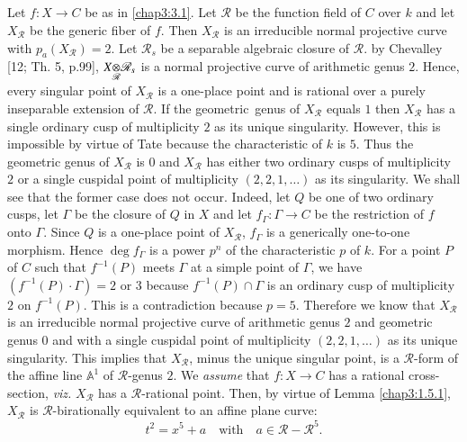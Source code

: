 \subsection{}\label{chap3:3.2}
Let $f:X\to C$ be as in \ref{chap3:3.1}. Let $\mathscr{R}$ be the function
field of $C$ over $k$ and let $X_{\mathscr{R}}$ be the generic fiber
of $f$. Then $X_{\mathscr{R}}$ is an irreducible normal projective
curve with $p_{a}(X_{\mathscr{R}})=2$. Let $\mathscr{R}_{s}$ be a
separable algebraic closure of $\mathscr{R}$. by Chevalley [12; Th.\@
  5, p.99], $\foprod{X}{\mathscr{R}_{s}}{\mathscr{R}}$ is a normal
projective curve of arithmetic genus $2$. Hence, every singular point
of $X_{\mathscr{R}}$ is a one-place point and is rational over a
purely inseparable extension of $\mathscr{R}$. If the
geometric\pageoriginale\ genus of $X_{\mathscr{R}}$ equals $1$ then
$X_{\mathscr{R}}$ has a single ordinary cusp of multiplicity $2$ as
its unique singularity. However, this is impossible by virtue of Tate
\cite{55} because the characteristic of $k$ is $5$. Thus the geometric
genus of $X_{\mathscr{R}}$ is $0$ and $X_{\mathscr{R}}$ has either two
ordinary cusps of multiplicity $2$ or a single cuspidal point of
multiplicity $(2,2,1,\ldots)$ as its singularity. We shall see that
the former case does not occur. Indeed, let $Q$ be one of two ordinary
cusps, let $\Gamma$ be the closure of $Q$ in $X$ and let
$f_{\Gamma}:\Gamma\to C$ be the restriction of $f$ onto
$\Gamma$. Since $Q$ is a one-place point of $X_{\mathscr{R}}$,
$f_{\Gamma}$ is a generically one-to-one morphism. Hence $\deg
f_{\Gamma}$ is a power $p^{n}$ of the characteristic $p$ of $k$. For a
point $P$ of $C$ such that $f^{-1}(P)$ meets $\Gamma$ at a simple
point of $\Gamma$, we have $(f^{-1}(P)\cdot \Gamma)=2$ or $3$ because
$f^{-1}(P)\cap \Gamma$ is an ordinary cusp of multiplicity $2$ on
$f^{-1}(P)$. This is a contradiction because $p=5$. Therefore we know
that $X_{\mathscr{R}}$ is an irreducible normal projective curve of
arithmetic genus $2$ and geometric genus $0$ and with a single
cuspidal point of multiplicity $(2,2,1,\ldots)$ as its unique
singularity. This implies that $X_{\mathscr{R}}$, minus the unique
singular point, is a $\mathscr{R}$-form of the affine line
$\mathbb{A}^{1}$ of $\mathscr{R}$-genus $2$. We {\em assume} that
$f:X\to C$ has a rational cross-section, {\em viz.\@}
$X_{\mathscr{R}}$ has a $\mathscr{R}$-rational point. Then, by virtue
of Lemma \ref{chap3:1.5.1}, $X_{\mathscr{R}}$ is
$\mathscr{R}$-birationally equivalent to an affine plane curve:
\begin{equation*}
t^{2}=x^{5}+a\quad\text{with}\quad a\in \mathscr{R}-\mathscr{R}^{5}.\tag{1}
\end{equation*}
